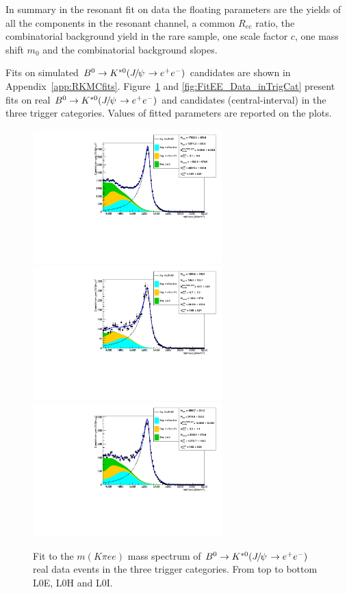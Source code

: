 In summary in the resonant fit on data the floating parameters are the yields of all the components
in the resonant channel, a common $R_{ee}$ ratio, the combinatorial background yield in the rare sample,
one scale factor $c$, one mass shift $m_0$ and the combinatorial background slopes.

Fits on simulated $\Bz\to\Kstarz(\jpsi\to\epem)$ candidates 
are shown in Appendix~\ref{app:RKMCfits}. Figure~\ref{fig:FitJpsiEE_Data_inTrigCat} and \ref{fig:FitEE_Data_inTrigCat}
present fits on real $\Bz\to\Kstarz(\jpsi\to\epem)$ and \mbox{\BdKstee} candidates (central-\qsq interval)
in the three trigger categories. Values of fitted parameters are reported on the plots.

\begin{figure}[h!]
\centering
\includegraphics[width=0.65\textwidth]{RKst/figs/fit_EEs_0_EE-q2central-gmc/KstJPsEE_L0E.pdf}
\includegraphics[width=0.65\textwidth]{RKst/figs/fit_EEs_0_EE-q2central-gmc/KstJPsEE_L0H.pdf}
\includegraphics[width=0.65\textwidth]{RKst/figs/fit_EEs_0_EE-q2central-gmc/KstJPsEE_L0I.pdf}
\caption{Fit to the $m(K\pi ee)$ mass spectrum of $\Bz \to \Kstarz (\jpsi\to \ee)$
real data events in the three trigger categories. From top to bottom L0E, L0H and L0I.}
\label{fig:FitJpsiEE_Data_inTrigCat}
\end{figure}
